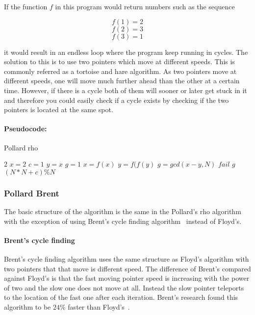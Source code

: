 If the function \(f\) in this program would return numbers such as the sequence

\[f(1) = 2\] 
\[f(2) = 3\] 
\[f(3) = 1\]

it would result in an endless loop where the program keep running in cycles. The solution to this is to use two pointers which move at different speeds. This is commonly referred as a tortoise and hare algorithm. 
As two pointers move at different speeds, one will move much further ahead than the other at a certain time. However, if there is a cycle both of them will sooner or later get stuck in it and therefore you could easily check if a cycle exists by checking if the two pointers is located at the same spot.

\paragraph{Pseudocode:}

\textcolor{white}{ }

\begin{algorithm}[H]
\caption{Pollard rho}
\begin{algorithmic}
	 	\State \Return $2$
	\EndIf
	\State $x = 2$
	\State $c = 1$
	\State $y = x$
	\State $g = 1$
		\State $x = f(x)$
		\State $y = f(f(y)$
		\State $g = gcd(x-y,N)$
	\EndWhile
		\State \Return $fail$
	\EndIf
	\State \Return $g$	
\EndFunction
{}
	\State \Return $(N*N + c) \% N$
\EndFunction
\end{algorithmic}
\end{algorithm}

\subsubsection{Pollard Brent}

The basic structure of the algorithm is the same in the Pollard's rho algorithm with the exception of using Brent's cycle finding algorithm~\cite{brent} instead of Floyd's.

\paragraph{Brent's cycle finding}

Brent’s cycle finding algorithm uses the same structure as Floyd’s algorithm with two pointers that that move is different speed. The difference of Brent’s compared against Floyd’s is that the fast moving pointer speed is increasing with the power of two and the slow one does not move at all. Instead the slow pointer teleports to the location of the fast one after each iteration.
Brent’s research found this algorithm to be $24\%$ faster than Floyd’s~\cite{brent}.

